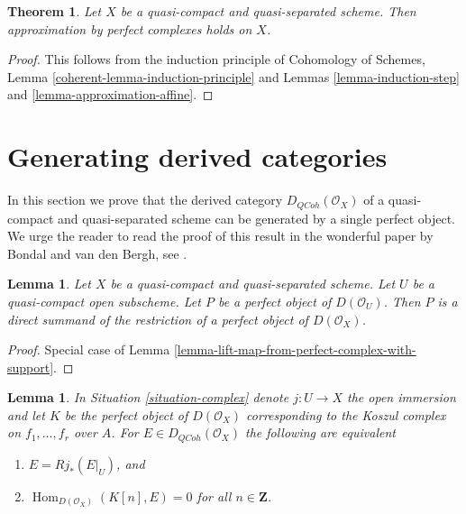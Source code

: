 \documentclass{stacks-project}
\newenvironment{reference}{\comment}{\endcomment}
\theoremstyle{plain}
\newtheorem{theorem}[subsection]{Theorem}
\newtheorem{lemma}[subsection]{Lemma}
\theoremstyle{definition}
\theoremstyle{remark}
\numberwithin{equation}{subsection}
\def\Hom{\mathop{\mathrm{Hom}}\nolimits}
\def\QCoh{\mathit{QCoh}}
\begin{document}
\begin{theorem}
\label{theorem-approximation}
Let $X$ be a quasi-compact and quasi-separated scheme.
Then approximation by perfect complexes holds on $X$.
\end{theorem}

\begin{proof}
This follows from the induction principle of
Cohomology of Schemes, Lemma \ref{coherent-lemma-induction-principle}
and Lemmas \ref{lemma-induction-step} and \ref{lemma-approximation-affine}.
\end{proof}






\section{Generating derived categories}
\label{section-generating}

\noindent
In this section we prove that the derived category
$D_\QCoh(\mathcal{O}_X)$ of a quasi-compact
and quasi-separated scheme can be generated by a single perfect object.
We urge the reader to read the proof of this result in the wonderful paper by
Bondal and van den Bergh, see \cite{BvdB}.

\begin{lemma}
\label{lemma-direct-summand-of-a-restriction}
Let $X$ be a quasi-compact and quasi-separated scheme.
Let $U$ be a quasi-compact open subscheme.
Let $P$ be a perfect object of $D(\mathcal{O}_U)$.
Then $P$ is a direct summand of the restriction of a perfect
object of $D(\mathcal{O}_X)$.
\end{lemma}

\begin{proof}
Special case of Lemma \ref{lemma-lift-map-from-perfect-complex-with-support}.
\end{proof}

\begin{lemma}
\label{lemma-orthogonal-koszul-complex}
\begin{reference}
\cite[Proposition 6.1]{Bokstedt-Neeman}
\end{reference}
In Situation \ref{situation-complex} denote $j : U \to X$ the open
immersion and let $K$ be the perfect object of $D(\mathcal{O}_X)$
corresponding to the Koszul complex on $f_1, \ldots, f_r$ over $A$.
For $E \in D_\QCoh(\mathcal{O}_X)$ the following are equivalent
\begin{enumerate}
\item $E = Rj_*(E|_U)$, and
\item $\Hom_{D(\mathcal{O}_X)}(K[n], E) = 0$ for all $n \in \mathbf{Z}$.
\end{enumerate}
\end{lemma}
\end{document}
